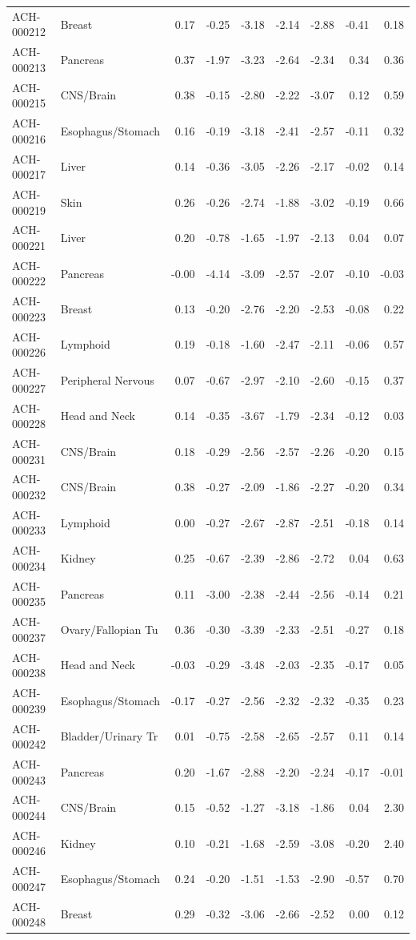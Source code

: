 \begin{footnotesize}
\begin{longtable}{llrrrrrrr}
ACH-000212 & Breast & 0.17 & -0.25 & -3.18 & -2.14 & -2.88 & -0.41 & 0.18 \\
ACH-000213 & Pancreas & 0.37 & -1.97 & -3.23 & -2.64 & -2.34 & 0.34 & 0.36 \\
ACH-000215 & CNS/Brain & 0.38 & -0.15 & -2.80 & -2.22 & -3.07 & 0.12 & 0.59 \\
ACH-000216 & Esophagus/Stomach & 0.16 & -0.19 & -3.18 & -2.41 & -2.57 & -0.11 & 0.32 \\
ACH-000217 & Liver & 0.14 & -0.36 & -3.05 & -2.26 & -2.17 & -0.02 & 0.14 \\
ACH-000219 & Skin & 0.26 & -0.26 & -2.74 & -1.88 & -3.02 & -0.19 & 0.66 \\
ACH-000221 & Liver & 0.20 & -0.78 & -1.65 & -1.97 & -2.13 & 0.04 & 0.07 \\
ACH-000222 & Pancreas & -0.00 & -4.14 & -3.09 & -2.57 & -2.07 & -0.10 & -0.03 \\
ACH-000223 & Breast & 0.13 & -0.20 & -2.76 & -2.20 & -2.53 & -0.08 & 0.22 \\
ACH-000226 & Lymphoid & 0.19 & -0.18 & -1.60 & -2.47 & -2.11 & -0.06 & 0.57 \\
ACH-000227 & Peripheral Nervous & 0.07 & -0.67 & -2.97 & -2.10 & -2.60 & -0.15 & 0.37 \\
ACH-000228 & Head and Neck & 0.14 & -0.35 & -3.67 & -1.79 & -2.34 & -0.12 & 0.03 \\
ACH-000231 & CNS/Brain & 0.18 & -0.29 & -2.56 & -2.57 & -2.26 & -0.20 & 0.15 \\
ACH-000232 & CNS/Brain & 0.38 & -0.27 & -2.09 & -1.86 & -2.27 & -0.20 & 0.34 \\
ACH-000233 & Lymphoid & 0.00 & -0.27 & -2.67 & -2.87 & -2.51 & -0.18 & 0.14 \\
ACH-000234 & Kidney & 0.25 & -0.67 & -2.39 & -2.86 & -2.72 & 0.04 & 0.63 \\
ACH-000235 & Pancreas & 0.11 & -3.00 & -2.38 & -2.44 & -2.56 & -0.14 & 0.21 \\
ACH-000237 & Ovary/Fallopian Tu & 0.36 & -0.30 & -3.39 & -2.33 & -2.51 & -0.27 & 0.18 \\
ACH-000238 & Head and Neck & -0.03 & -0.29 & -3.48 & -2.03 & -2.35 & -0.17 & 0.05 \\
ACH-000239 & Esophagus/Stomach & -0.17 & -0.27 & -2.56 & -2.32 & -2.32 & -0.35 & 0.23 \\
ACH-000242 & Bladder/Urinary Tr & 0.01 & -0.75 & -2.58 & -2.65 & -2.57 & 0.11 & 0.14 \\
ACH-000243 & Pancreas & 0.20 & -1.67 & -2.88 & -2.20 & -2.24 & -0.17 & -0.01 \\
ACH-000244 & CNS/Brain & 0.15 & -0.52 & -1.27 & -3.18 & -1.86 & 0.04 & 2.30 \\
ACH-000246 & Kidney & 0.10 & -0.21 & -1.68 & -2.59 & -3.08 & -0.20 & 2.40 \\
ACH-000247 & Esophagus/Stomach & 0.24 & -0.20 & -1.51 & -1.53 & -2.90 & -0.57 & 0.70 \\
ACH-000248 & Breast & 0.29 & -0.32 & -3.06 & -2.66 & -2.52 & 0.00 & 0.12 \\
\end{longtable}\end{footnotesize}

